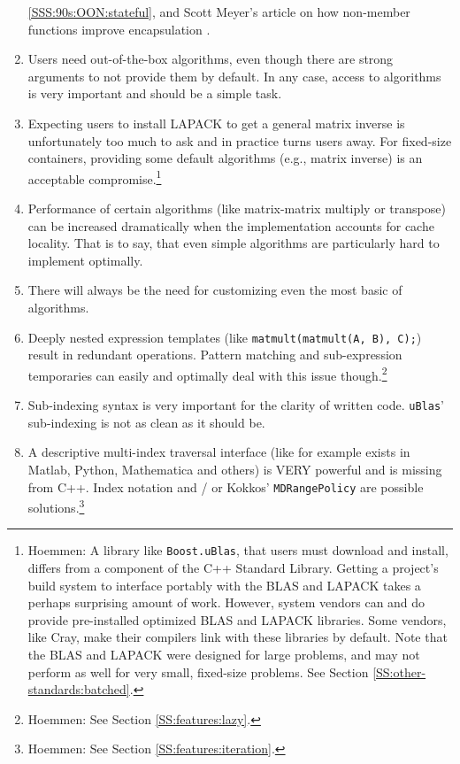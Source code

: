 \begin{enumerate}
{    \ref{SSS:90s:OON:stateful}, and Scott Meyer's article on how
    non-member functions improve encapsulation
    \cite{meyers2000nonmember}.}
\item Users need out-of-the-box algorithms, even though there are
  strong arguments to not provide them by default. In any case, access
  to algorithms is very important and should be a simple task.
\item Expecting users to install LAPACK to get a general matrix
  inverse is unfortunately too much to ask and in practice turns users
  away. For fixed-size containers, providing some default algorithms
  (e.g., matrix inverse) is an acceptable
  compromise.\footnote{Hoemmen: A library like \texttt{Boost.uBlas},
    that users must download and install, differs from a component of
    the C++ Standard Library.  Getting a project's build system to
    interface portably with the BLAS and LAPACK takes a perhaps
    surprising amount of work.  However, system vendors can and do
    provide pre-installed optimized BLAS and LAPACK libraries.  Some
    vendors, like Cray, make their compilers link with these libraries
    by default.  Note that the BLAS and LAPACK were designed for large
    problems, and may not perform as well for very small, fixed-size
    problems.  See Section \ref{SS:other-standards:batched}.}
\item Performance of certain algorithms (like matrix-matrix multiply
  or transpose) can be increased dramatically when the implementation
  accounts for cache locality. That is to say, that even simple
  algorithms are particularly hard to implement optimally.
\item There will always be the need for customizing even the most
  basic of algorithms.
\item Deeply nested expression templates (like
  \texttt{matmult(matmult(A, B), C);}) result in redundant
  operations. Pattern matching and sub-expression temporaries can
  easily and optimally deal with this issue though.\footnote{Hoemmen:
    See Section \ref{SS:features:lazy}.}
\item Sub-indexing syntax is very important for the clarity of written
  code. \texttt{uBlas}' sub-indexing is not as clean as it should be.
\item A descriptive multi-index traversal interface (like for example
  exists in Matlab, Python, Mathematica and others) is VERY powerful
  and is missing from C++. Index notation and / or Kokkos'
  \texttt{MDRangePolicy} are possible solutions.\footnote{Hoemmen: See
    Section \ref{SS:features:iteration}.}

\end{enumerate}
